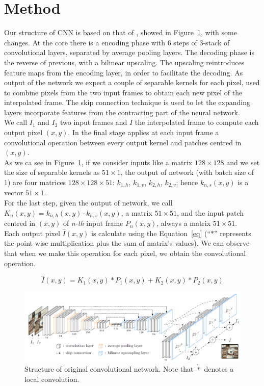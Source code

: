 \documentclass[11pt, a4paper]{article}
\begin{document}
	\section{Method}
	Our structure of CNN is based on that of \cite{mainpaper}, showed in Figure~\ref{original-net}, with some changes. At the core there is a encoding phase with 6 steps of 3-stack of convolutional layers, separated by average pooling layers. The decoding phase is the reverse of previous, with a bilinear upscaling. The upscaling reintroduces feature maps from the encoding layer, in order to facilitate the decoding. As output of the network we expect a couple of separable kernels for each pixel, used to combine pixels from the two input frames to obtain each new pixel of the interpolated frame. The skip connection technique is used to let the expanding layers incorporate features from the contracting part of the neural network.\\
	We call $I_1$ and $I_2$ two input frames and $\hat{I}$ the interpolated frame to compute each output pixel $(x,y)$. In the final stage applies at each input frame a convolutional operation between every output kernel and patches centred in $(x,y)$.\\
	As we ca see in Figure~\ref{original-net}, if we consider inputs like a matrix $128\times128$ and we set the size of separable kernels as $51\times1$, the output of network (with batch size of 1) are four matrices $128\times128\times51$: $k_{1,h}$, $k_{1,v}$, $k_{2,h}$, $k_{2,v}$; hence $k_{n,s}(x,y)$ is a vector $51\times1$.\\
	For the last step, given the output of network, we call $K_n(x,y) = k_{n,h}(x,y) \cdot k_{n,v}(x,y)$, a matrix $51\times51$, and the input patch centred in $(x,y)$ of \textit{n-th} input frame $P_n(x,y)$, always a matrix $51\times51$.\\
	Each output pixel $\hat{I}(x,y)$ is calculate using the Equation~\ref{eq} (``$*$'' represents the point-wise multiplication plus the sum of matrix's values). We can observe that when we make this operation for each pixel, we obtain the convolutional operation. 
	
	\begin{equation}
		\hat{I}(x,y) = K_1(x,y) * P_1(x,y) + K_2(x,y) * P_2(x,y)
		\label{eq}
	\end{equation}
	
	\begin{figure}
		\centering
		\includegraphics[width=0.6\textheight]{net_structure}
		\caption{Structure of original convolutional network. Note that $\dot{*}$ denotes a local convolution.}
		\label{original-net}
	\end{figure}
\end{document}
